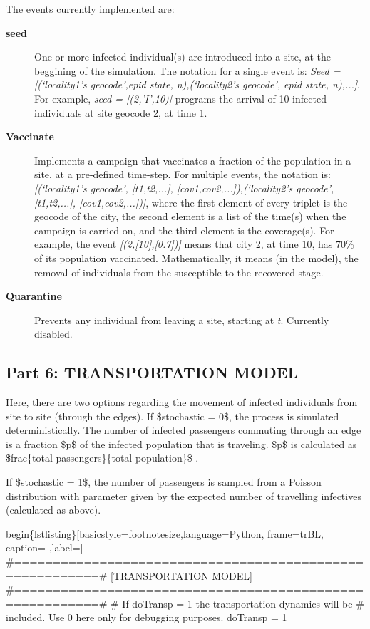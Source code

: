 \documentclass[a4paper,10pt]{manual}
\begin{document}
The events currently implemented are:
\begin{description}
\item[\textbf{seed}]
One or more infected individual(s) are introduced into a site, at the beggining of the simulation. The notation for a single event is: \emph{Seed = {[}(`locality1's geocode',epid state, n),(`locality2's geocode', epid state, n),...{]}}. For example, \emph{seed = {[}(2,'I',10){]}} programs the arrival of 10 infected individuals at site geocode 2, at time 1.

\item[\textbf{Vaccinate}]
Implements a campaign that vaccinates a fraction of the population in a site, at a pre-defined time-step. For multiple events, the notation is: \emph{{[}(`locality1's geocode', {[}t1,t2,...{]}, {[}cov1,cov2,...{]}),(`locality2's geocode', {[}t1,t2,...{]}, {[}cov1,cov2,...{]}){]}}, where the first element of every triplet is the geocode of the city, the second element is a list of the time(s) when the campaign is carried on, and the third element is the coverage(s). For example, the event \emph{{[}(2,{[}10{]},{[}0.7{]}){]}} means that city 2, at time 10, has 70\% of its population vaccinated. Mathematically, it means (in the model), the removal of individuals from the susceptible to the recovered stage.

\item[\textbf{Quarantine}]
Prevents any individual from leaving a site, starting at \emph{t}. Currently disabled.

\end{description}


\subsection{Part 6: TRANSPORTATION MODEL}

Here, there are two options regarding the movement of infected individuals from site to site (through the edges). If \$stochastic = 0\$, the process is simulated deterministically. The number of infected passengers commuting through an edge is a fraction \$p\$ of the infected population that is traveling. \$p\$ is calculated as \$frac\{total passengers\}\{total population\}\$ .

If \$stochastic = 1\$, the number of passengers is sampled from a Poisson distribution with parameter given by the expected number of travelling infectives (calculated as above).

begin\{lstlisting\}{[}basicstyle=footnotesize,language=Python, frame=trBL, caption= ,label={]}
\#=========================================================\#
{[}TRANSPORTATION MODEL{]}
\#=========================================================\#
\# If doTransp = 1 the transportation dynamics will be
\# included. Use 0 here only for debugging purposes.
doTransp = 1
\end{document}
